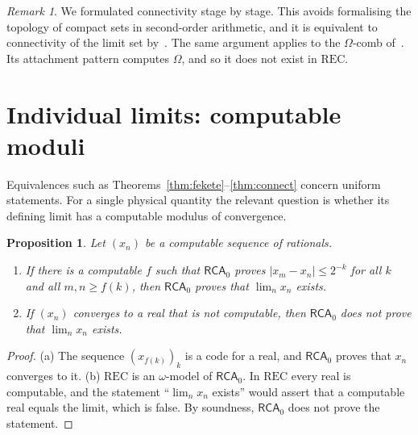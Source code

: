 \documentclass[11pt]{article}
\newtheorem{proposition}{Proposition}[section]
\theoremstyle{definition}\newtheorem{definition}{Definition}[section]
\theoremstyle{remark}\newtheorem*{remark}{Remark}
\newcommand{\RCA}{\mathsf{RCA}_0}
\newcommand{\REC}{\mathrm{REC}}
\begin{document}
\begin{remark}
We formulated connectivity stage by stage. This avoids formalising the topology of compact sets in second-order
arithmetic, and it is equivalent to connectivity of the limit set by~\cite{Chen2026_fcu}. The same argument applies to the
$\Omega$-comb of~\cite{Chen2026_fcu}. Its attachment pattern computes $\Omega$, and so it does not exist in $\REC$.
\end{remark}

\section{Individual limits: computable moduli}
\label{sec:instances}

Equivalences such as Theorems~\ref{thm:fekete}--\ref{thm:connect} concern uniform statements. For a single physical
quantity the relevant question is whether its defining limit has a computable modulus of convergence.

\begin{proposition}
\label{prop:instance}
Let $(x_n)$ be a computable sequence of rationals.
\begin{enumerate}
\item[(a)] If there is a computable $f$ such that $\RCA$ proves $|x_m-x_n|\le2^{-k}$ for all $k$ and all $m,n\ge f(k)$, then $\RCA$ proves
that $\lim_nx_n$ exists.
\item[(b)] If $(x_n)$ converges to a real that is not computable, then $\RCA$ does not prove that $\lim_nx_n$ exists.
\end{enumerate}
\end{proposition}

\begin{proof}
(a) The sequence $(x_{f(k)})_k$ is a code for a real, and $\RCA$ proves that $x_n$ converges to it. (b) $\REC$ is an $\omega$-model of
$\RCA$. In $\REC$ every real is computable, and the statement ``$\lim_nx_n$ exists'' would assert that a computable real equals the
limit, which is false. By soundness, $\RCA$ does not prove the statement.
\end{proof}
\end{document}
